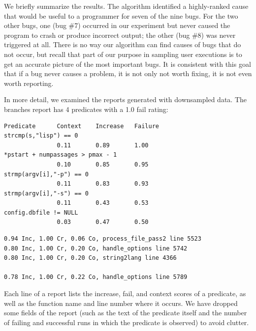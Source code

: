We briefly summarize the results.
The algorithm identified a highly-ranked cause that would be useful to a programmer
for seven of the nine bugs.  For the two other bugs,
one (bug \#7) occurred in our experiment but never caused
the program to crash or produce incorrect output; the other (bug \#8) was never
triggered at all.  There is no way our algorithm can find causes of bugs that do not
occur, but recall that part of our purpose in sampling user executions
is to get an accurate picture of the most important bugs. It is consistent with
this goal that if a bug never causes a problem, it is not only not worth fixing,
it is not even worth reporting.

In more detail, we examined the reports generated with  downsampled data.
The branches report has 4 predicates with a 1.0 fail rating:
\begin{verbatim}
Predicate      Context    Increase   Failure
strcmp(s,"lisp") == 0  
               0.11       0.89       1.00
*pstart + numpassages > pmax - 1 
               0.10       0.85       0.95
strmp(argv[i],"-p") == 0
               0.11       0.83       0.93
strmp(argv[i],"-s") == 0
               0.11       0.43       0.53
config.dbfile != NULL
               0.03       0.47       0.50
\end{verbatim}


\begin{verbatim}
0.94 Inc, 1.00 Cr, 0.06 Co, process_file_pass2 line 5523
0.80 Inc, 1.00 Cr, 0.20 Co, handle_options line 5742
0.80 Inc, 1.00 Cr, 0.20 Co, string2lang line 4366

0.78 Inc, 1.00 Cr, 0.22 Co, handle_options line 5789
\end{verbatim}

Each line of a report lists the increase, fail, and context scores of
a predicate, as well as the function name and line number where it
occurs.  We have dropped some fields of the report (such as the text
of the predicate itself and the number of failing and successful runs
in which the predicate is observed) to avoid clutter.

